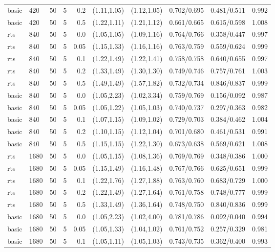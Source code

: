 \begin{tabular}{llrrrccccc}
basic & 420 & 50 & 5 & 0.2 & (1.11,1.05) & (1.12,1.05) & 0.702/0.695 & 0.481/0.511 & 0.992 \\
basic & 420 & 50 & 5 & 0.5 & (1.22,1.11) & (1.21,1.12) & 0.661/0.665 & 0.615/0.598 & 1.008 \\
rts & 840 & 50 & 5 & 0.0 & (1.05,1.05) & (1.09,1.16) & 0.764/0.766 & 0.358/0.447 & 0.997 \\
rts & 840 & 50 & 5 & 0.05 & (1.15,1.33) & (1.16,1.16) & 0.763/0.759 & 0.559/0.624 & 0.999 \\
rts & 840 & 50 & 5 & 0.1 & (1.22,1.49) & (1.22,1.41) & 0.758/0.758 & 0.640/0.655 & 0.997 \\
rts & 840 & 50 & 5 & 0.2 & (1.33,1.49) & (1.30,1.30) & 0.749/0.746 & 0.757/0.761 & 1.003 \\
rts & 840 & 50 & 5 & 0.5 & (1.49,1.49) & (1.57,1.82) & 0.732/0.734 & 0.846/0.837 & 0.999 \\
basic & 840 & 50 & 5 & 0.0 & (1.05,2.23) & (1.02,3.34) & 0.759/0.769 & 0.156/0.092 & 0.987 \\
basic & 840 & 50 & 5 & 0.05 & (1.05,1.22) & (1.05,1.03) & 0.740/0.737 & 0.297/0.363 & 0.982 \\
basic & 840 & 50 & 5 & 0.1 & (1.07,1.15) & (1.09,1.02) & 0.729/0.703 & 0.384/0.462 & 1.004 \\
basic & 840 & 50 & 5 & 0.2 & (1.10,1.15) & (1.12,1.04) & 0.701/0.680 & 0.461/0.531 & 0.991 \\
basic & 840 & 50 & 5 & 0.5 & (1.15,1.15) & (1.22,1.30) & 0.673/0.638 & 0.569/0.621 & 1.008 \\
rts & 1680 & 50 & 5 & 0.0 & (1.05,1.15) & (1.08,1.36) & 0.769/0.769 & 0.348/0.386 & 1.000 \\
rts & 1680 & 50 & 5 & 0.05 & (1.15,1.49) & (1.16,1.48) & 0.767/0.766 & 0.625/0.651 & 0.999 \\
rts & 1680 & 50 & 5 & 0.1 & (1.22,1.76) & (1.27,1.88) & 0.763/0.760 & 0.683/0.729 & 1.000 \\
rts & 1680 & 50 & 5 & 0.2 & (1.22,1.49) & (1.27,1.64) & 0.761/0.758 & 0.748/0.777 & 0.999 \\
rts & 1680 & 50 & 5 & 0.5 & (1.33,1.49) & (1.36,1.64) & 0.748/0.750 & 0.840/0.836 & 0.999 \\
basic & 1680 & 50 & 5 & 0.0 & (1.05,2.23) & (1.02,4.00) & 0.781/0.786 & 0.092/0.040 & 0.994 \\
basic & 1680 & 50 & 5 & 0.05 & (1.05,1.33) & (1.04,1.02) & 0.761/0.752 & 0.257/0.329 & 0.981 \\
basic & 1680 & 50 & 5 & 0.1 & (1.05,1.11) & (1.05,1.03) & 0.743/0.735 & 0.362/0.400 & 0.993 \\

\end{tabular}
